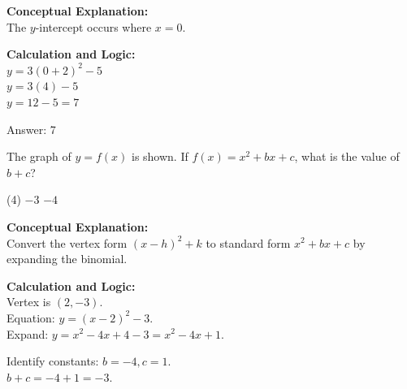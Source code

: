 \documentclass[11pt,paper=a4,answers]{exam}
\begin{document}
\begin{questions}
\begin{solution}
\textbf{Conceptual Explanation:} \\
The $y$-intercept occurs where $x = 0$.

\vspace{20pt}

\textbf{Calculation and Logic:} \\
$y = 3(0+2)^2 - 5$ \\
$y = 3(4) - 5$ \\
$y = 12 - 5 = 7$

\vspace{25pt}

Answer: \colorbox{yellow!100}{7}
\end{solution}

\vspace{40pt}

\question
\begin{center}
\end{center}
The graph of $y = f(x)$ is shown. If $f(x) = x^2 + bx + c$, what is the value of $b + c$?
\begin{tasks}(4)
    \task $-3$
    \task $-4$
\end{tasks}

\begin{solution}
\textbf{Conceptual Explanation:} \\
Convert the vertex form $(x-h)^2 + k$ to standard form $x^2 + bx + c$ by expanding the binomial.

\vspace{20pt}

\textbf{Calculation and Logic:} \\
Vertex is $(2, -3)$. \\
Equation: $y = (x-2)^2 - 3$. \\
Expand: $y = x^2 - 4x + 4 - 3 = x^2 - 4x + 1$.

\vspace{10pt}

Identify constants: $b = -4, c = 1$. \\
$b + c = -4 + 1 = -3$.


\end{solution}
\end{questions}
\end{document}
